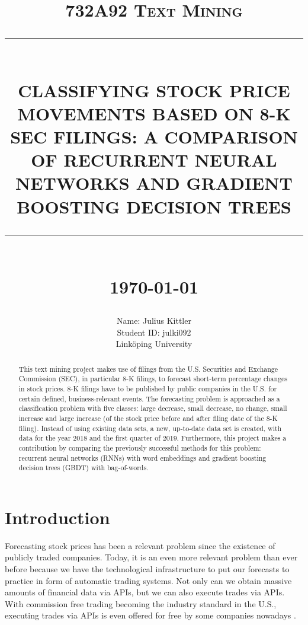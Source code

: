 \documentclass{article}
\newcommand{\HRule}[1]{\rule{\linewidth}{#1}}
\begin{document}
	
	\title{\textsc{732A92 Text Mining} \\ [2.0cm]
		\HRule{0.5pt} \\
		\LARGE \textbf{\uppercase{Classifying Stock Price Movements based on 8-K SEC filings: A comparison of Recurrent Neural Networks and Gradient Boosting Decision Trees}}
		\HRule{2pt} \\ [0.5cm]
		\normalsize \today \vspace*{5\baselineskip}}
	
	\date{}
	
	\author{
		Name: Julius Kittler \\ 
		Student ID: julki092 \\ 
		Link\"{o}ping University}
	
	\maketitle
	\newpage
	
	\begin{abstract}
		
	This text mining project makes use of filings from the U.S. Securities and Exchange Commission (SEC), in particular 8-K filings, to forecast short-term percentage changes in stock prices. 8-K filings have to be published by public companies in the U.S. for certain defined, business-relevant events. The forecasting problem is approached as a classification problem with five classes: large decrease, small decrease, no change, small increase and large increase (of the stock price before and after filing date of the 8-K filing). Instead of using existing data sets, a new, up-to-date data set is created, with data for the year 2018 and the first quarter of 2019. Furthermore, this project makes a contribution by comparing the previously successful methods for this problem: recurrent neural networks (RNNs) with word embeddings  and gradient boosting decision trees (GBDT) with bag-of-words. 
	
	\end{abstract}

	\newpage
	\tableofcontents
	\newpage
	\listoffigures
	\listoftables
	\newpage

	\section{Introduction}
	
	Forecasting stock prices has been a relevant problem since the existence of publicly traded companies. Today, it is an even more relevant problem than ever before because we have the technological infrastructure to put our forecasts to practice in form of automatic trading systems. Not only can we obtain massive amounts of financial data via APIs, but we can also execute trades via APIs. With commission free trading becoming the industry standard in the U.S., executing trades via APIs is even offered for free by some companies nowadays \cite{noauthor_alpaca_nodate}. 
\end{document}
